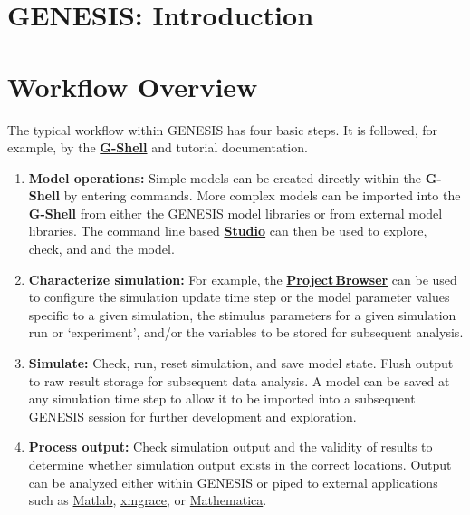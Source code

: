 \documentclass[12pt]{article}
\begin{document}
\section*{GENESIS: Introduction}

\section*{Workflow Overview}

The typical workflow within GENESIS has four basic steps. It is followed, for example, by the \href{../gshell/gshell.tex}{\bf G-Shell} and tutorial documentation.

\begin{enumerate}

\item {\bf Model operations:} Simple models can be created directly within the {\bf G-Shell} by entering commands. More complex models can be imported into the {\bf G-Shell} from either the GENESIS model libraries or from external model libraries. The command line based \href{../studio/studio.tex}{\bf Studio} can then be used to explore, check, and and the model.

\item {\bf Characterize simulation:} For example,  the \href{../project-browser/project-browser.tex}{\bf Project\,Browser} can be used to configure the simulation update time step or the model parameter values specific to a given simulation, the stimulus parameters for a given simulation run or  `experiment', and/or the variables to be stored for subsequent analysis.

\item  {\bf Simulate:} Check, run, reset simulation, and save model state. Flush output to raw result storage for subsequent data analysis. A model can be saved at any simulation time step to allow it to be imported into a subsequent GENESIS session for further development and exploration.

\item {\bf Process output:}  Check simulation output and the validity of results to determine whether simulation output exists in the correct locations. Output can be analyzed either within GENESIS or piped to external applications such as \href{http://www.mathworks.com/}{Matlab}, \href{http://www.mathworks.com/}{xmgrace}, or \href{http://www.wolfram.com/}{Mathematica}.

\end{enumerate}
\end{document}
